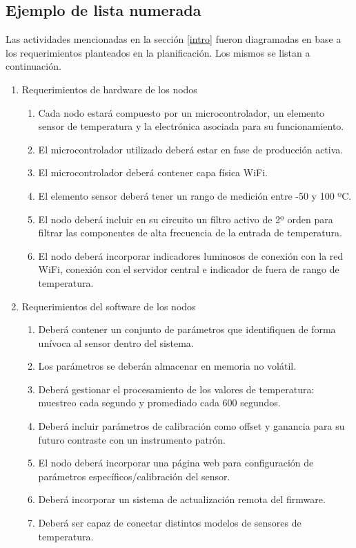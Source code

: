 \vspace{1cm}
\subsection{Ejemplo de lista numerada}

Las actividades mencionadas en la sección \ref{intro} fueron diagramadas en base a los requerimientos planteados en la planificación. Los mismos se listan a continuación.

\begin{enumerate}
\item Requerimientos de hardware de los nodos
	\begin{enumerate}
	\item Cada nodo estará compuesto por un microcontrolador, un elemento sensor de temperatura y la electrónica asociada para su funcionamiento.
	\item El microcontrolador utilizado deberá estar en fase de producción activa.
	\item El microcontrolador deberá contener capa física WiFi.	
	\item El elemento sensor deberá tener un rango de medición entre -50 y 100 ºC.
	\item El nodo deberá incluir en su circuito un filtro activo de 2º orden para filtrar las componentes de alta frecuencia de la entrada de temperatura.
	\item El nodo deberá incorporar indicadores luminosos de conexión con la red WiFi, conexión con el servidor central e indicador de fuera de rango de temperatura.	
	\end{enumerate}
	
\item Requerimientos del software de los nodos
	\begin{enumerate}
	\item Deberá contener un conjunto de parámetros que identifiquen de forma unívoca al sensor dentro del sistema.	
	\item Los parámetros se deberán almacenar en memoria no volátil.
	\item Deberá gestionar el procesamiento de los valores de temperatura: muestreo cada segundo y promediado cada 600 segundos.	
	\item Deberá incluir parámetros de calibración como offset y ganancia para su futuro contraste con un instrumento patrón.
	\item El nodo deberá incorporar una página web para configuración de parámetros específicos/calibración del sensor.
	\item Deberá incorporar un sistema de actualización remota del firmware.
    \item Deberá ser capaz de conectar distintos modelos de sensores de temperatura.
	\end{enumerate}	
	

\end{enumerate}
